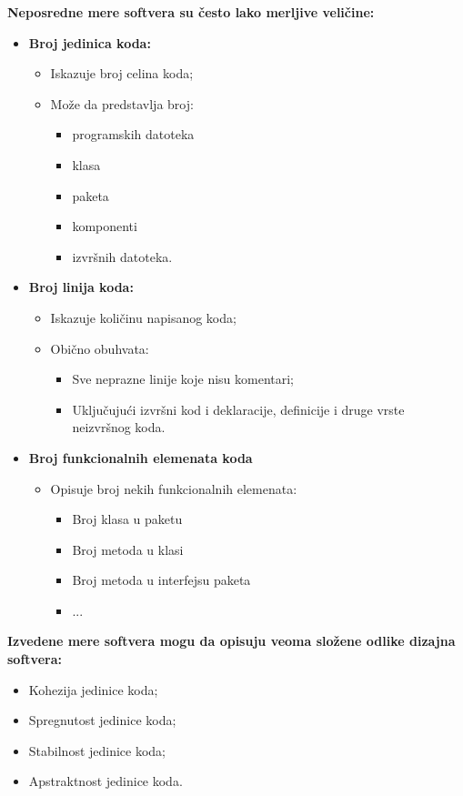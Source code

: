 \documentclass[a4paper]{article}
\begin{document}
  \textbf{Neposredne mere softvera su često lako merljive veličine:}
  \begin{itemize}
    \item \textbf{Broj jedinica koda:}
      \begin{itemize}
        \item Iskazuje broj celina koda;
        \item Može da predstavlja broj:
          \begin{itemize}
            \item programskih datoteka 
            \item klasa
            \item paketa
            \item komponenti
            \item izvršnih datoteka.
          \end{itemize}
    \end{itemize}
    \item \textbf{Broj linija koda:}
      \begin{itemize}
        \item Iskazuje količinu napisanog koda;
        \item Obično obuhvata:
          \begin{itemize}
            \item Sve neprazne linije koje nisu komentari;
            \item Uključujući izvršni kod i deklaracije, definicije i druge vrste neizvršnog koda.
          \end{itemize}
      \end{itemize}
    \item \textbf{Broj funkcionalnih elemenata koda}
      \begin{itemize}
        \item Opisuje broj nekih funkcionalnih elemenata:
          \begin{itemize}
            \item Broj klasa u paketu
            \item Broj metoda u klasi
            \item Broj metoda u interfejsu paketa 
            \item ...
          \end{itemize}
      \end{itemize}
  \end{itemize}
  \textbf{Izvedene mere softvera mogu da opisuju veoma složene odlike dizajna softvera:}
  \begin{itemize}
    \item Kohezija jedinice koda;
    \item Spregnutost jedinice koda;
    \item Stabilnost jedinice koda;
    \item Apstraktnost jedinice koda.
  \end{itemize}
  
\end{document}
